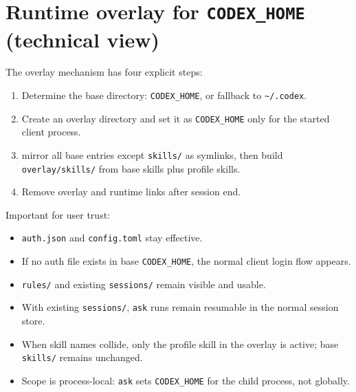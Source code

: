 \documentclass[a4paper,11pt]{article}
\begin{document}
\section{Runtime overlay for \texttt{CODEX\_HOME} (technical view)}
\begin{center}
\end{center}

\noindent
The overlay mechanism has four explicit steps:
\begin{enumerate}
  \item Determine the base directory: \texttt{CODEX\_HOME}, or fallback to \texttt{\textasciitilde/.codex}.
  \item Create an overlay directory and set it as \texttt{CODEX\_HOME} only for the started client process.
  \item mirror all base entries except \texttt{skills/} as symlinks, then
        build \texttt{overlay/skills/} from base skills plus profile skills.
  \item Remove overlay and runtime links after session end.
\end{enumerate}

\noindent
Important for user trust:
\begin{itemize}
  \item \texttt{auth.json} and \texttt{config.toml} stay effective.
  \item If no auth file exists in base \texttt{CODEX\_HOME}, the normal client login flow appears.
  \item \texttt{rules/} and existing \texttt{sessions/} remain visible and usable.
  \item With existing \texttt{sessions/}, \texttt{ask} runs remain resumable in the normal session store.
  \item When skill names collide, only the profile skill in the overlay is active; base \texttt{skills/} remains unchanged.
  \item Scope is process-local: \texttt{ask} sets \texttt{CODEX\_HOME} for the child process, not globally.
\end{itemize}
\end{document}
